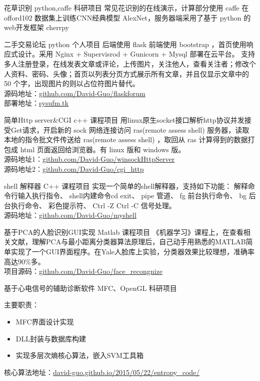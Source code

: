 \documentclass[14pt,a4paper]{moderncv}
\begin{document}
{花草识别}
{python,caffe}
{科研项目}{}
{常见花识别的在线演示，计算部分使用 caffe 在 offord102 数据集上训练CNN经典模型 AlexNet，服务器端采用了基于 python 的 web开发框架 cherrpy}

{二手交易论坛}
{python}
{个人项目}{}
{后端使用 flask 前端使用 bootstrap ，首页使用响应式设计。采用 Nginx + Supervisrod + Gunicorn + Mysql 部署在云平台。
支持多人注册登录，在线发表文章或评论，上传图片，关注他人，查看关注者；修改个人资料、密码、头像；首页以列表分页方式展示所有文章，并且仅显示文章中的 50 个字，出现图片的则以占位符图片替代。
\\源码地址：\url{github.com/David-Guo/flaskforum}
\\部署地址：\url{sysufm.tk}}

{简单Http server\&CGI}
{c++}
{课程项目}{}
{用linux原生socket接口解析http协议并发接受Get请求，开启新的 sock 网络连接访问 ras(remote assess shell) 服务器，读取本地的指令批文件传送给 ras(remote assess shell) ，取回从 ras 计算得到的数据打包成 html 页面返回给浏览器。有 linux 版和 windows 版。
\\源码地址1：\url{github.com/David-Guo/winsockHttpServer}
\\源码地址2：\url{github.com/David-Guo/cgi_http}}

{shell 解释器}
{C++}
{课程项目}{}
{实现一个简单的shell解释器，支持如下功能：
  	解释命令行输入执行指令、
    shell内建命令cd exit、
    pipe 管道、
    fg 前台执行命令、
    bg 后台执行命令、
    彩色提示符、
    Ctrl -Z Ctrl -C 信号处理。
\\源码地址：\url{github.com/David-Guo/myshell}}

{基于PCA的人脸识别GUI实现}
{Matlab}
{课程项目}{}
{《机器学习》课程上，在查看相关文献，理解PCA与最小距离分类器算法原理后，自己动手用熟悉的MATLAB简单实现了一个GUI界面程序。在Yale人脸库上实验，分类器效果比较理想，准确率高达90\%多。
\\项目源码：\url{github.com/David-Guo/face_recongnize}}

{基于心电信号的辅助诊断软件}
{MFC、OpenGL}
{科研项目}{}
{主要职责：
\begin{itemize}
	\item MFC界面设计实现
	\item DLL封装与数据库构建
	\item 实现多层次熵核心算法，嵌入SVM工具箱
\end{itemize}
核心算法地址：{\url{david-guo.github.io/2015/05/22/entropy_code/}}}
\end{document}
